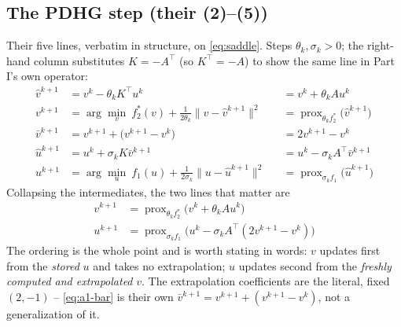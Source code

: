 \documentclass[11pt]{article}
\newcommand{\prox}{\operatorname{prox}}
\begin{document}
\subsection*{The PDHG step (their (2)--(5))}
Their five lines, verbatim in structure, on \eqref{eq:saddle}. Steps
$\theta_k,\sigma_k>0$; the right-hand column substitutes $K=-A^\top$ (so
$K^\top=-A$) to show the same line in Part I's own operator:
\begin{align}
\hat v^{k+1} &= v^k-\theta_k K^\top u^k &&= v^k+\theta_k A u^k \label{eq:a1-1hat}\\
v^{k+1} &= \arg\min_{v}\ f_2^*(v)+\tfrac1{2\theta_k}\|v-\hat v^{k+1}\|^2
        &&= \prox_{\theta_kf_2^*}\big(\hat v^{k+1}\big) \label{eq:a1-1}\\
\bar v^{k+1} &= v^{k+1}+\big(v^{k+1}-v^k\big) &&= 2v^{k+1}-v^k \label{eq:a1-bar}\\
\hat u^{k+1} &= u^k+\sigma_k K\bar v^{k+1} &&= u^k-\sigma_k A^\top\bar v^{k+1} \label{eq:a1-2hat}\\
u^{k+1} &= \arg\min_{u}\ f_1(u)+\tfrac1{2\sigma_k}\|u-\hat u^{k+1}\|^2
        &&= \prox_{\sigma_kf_1}\big(\hat u^{k+1}\big) \label{eq:a1-2}
\end{align}
Collapsing the intermediates, the two lines that matter are
\begin{align}
v^{k+1} &= \prox_{\theta_kf_2^*}\big(v^k+\theta_kAu^k\big) \label{eq:a1-1s}\\
u^{k+1} &= \prox_{\sigma_kf_1}\big(u^k-\sigma_kA^\top(2v^{k+1}-v^k)\big) \label{eq:a1-2s}
\end{align}
The ordering is the whole point and is worth stating in words: $v$ updates first
from the \emph{stored} $u$ and takes no extrapolation; $u$ updates second from the
\emph{freshly computed and extrapolated} $v$. The extrapolation coefficients are
the literal, fixed $(2,-1)$ -- \eqref{eq:a1-bar} is their own
$\bar v^{k+1}=v^{k+1}+(v^{k+1}-v^k)$, not a generalization of it.
\end{document}
